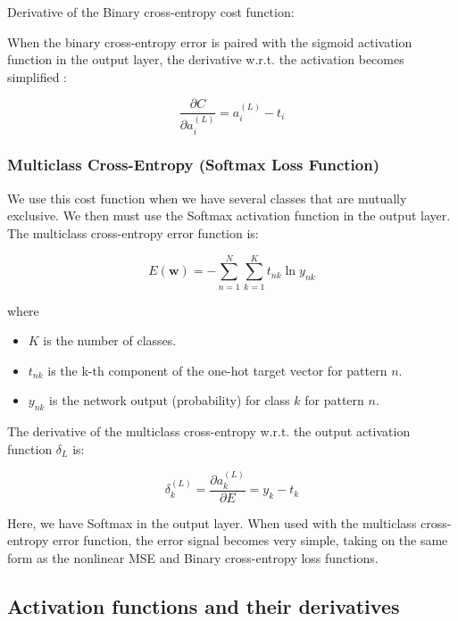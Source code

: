 \documentclass[amssymb,twocolumn,aps,floatfix]{revtex4-2}
\begin{document}
Derivative of the Binary cross-entropy cost function: 

When the binary cross-entropy error is paired with the sigmoid activation function in the output layer, the derivative w.r.t. the activation becomes simplified \citep[p.206]{bishop2006pattern}: 

\begin{equation}
    \frac{\partial C}{\partial a_i^{(L)}} = a_i^{(L)} - t_i
\end{equation}

\subsubsection{Multiclass Cross-Entropy (Softmax Loss Function)}

We use this cost function when we have several classes that are mutually exclusive. We then must use the Softmax activation function in the output layer. The multiclass cross-entropy error function is: 

\begin{equation}
    E(\mathbf{w}) = - \sum_{n=1}^{N} \sum_{k=1}^{K} t_{nk} \ln y_{nk}
    \label{eq:multiclass_error}
\end{equation}

where 

\begin{itemize}
    \item $K$ is the number of classes.
    \item $t_{nk}$ is the k-th component of the one-hot target vector for pattern $n$.
    \item $y_{nk}$ is the network output (probability) for class $k$ for pattern $n$.
\end{itemize}

The derivative of the multiclass cross-entropy w.r.t. the output activation function $\delta_L$ is: 

\begin{equation}
    \delta_k^{(L)} = \frac{\partial a_k^{(L)}}{\partial E} = y_k - t_k
    \label{eq:multiclass_der}
\end{equation}

Here, we have Softmax in the output layer. When used with the multiclass cross-entropy error function, the error signal becomes very simple, taking on the same form as the nonlinear MSE and Binary cross-entropy loss functions. 

\subsection{Activation functions and their derivatives}
\end{document}
